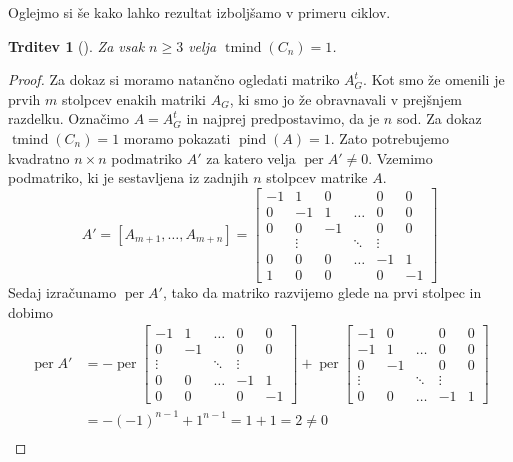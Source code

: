 \documentclass[12pt,a4paper,twoside]{article}
\theoremstyle{definition} %
\theoremstyle{plain} %
\newtheorem{trditev}[definicija]{Trditev}
\numberwithin{equation}{section}  %
\DeclareMathOperator{\per}{per}
\DeclareMathOperator{\tmind}{tmind}
\DeclareMathOperator{\pind}{pind}
\begin{document}
Oglejmo si še kako lahko rezultat izboljšamo v primeru ciklov.
\begin{trditev}[\citet{algebraic}]
\label{list_t_cycle}
Za vsak $n\ge 3$ velja $\tmind(C_n) = 1$.
\end{trditev}

\begin{proof}
Za dokaz si moramo natančno ogledati matriko $A_G^t$. Kot smo že omenili je prvih $m$ stolpcev enakih matriki $A_G$, ki smo jo že obravnavali v prejšnjem razdelku. Označimo $A =  A_G^t$ in najprej predpostavimo, da je $n$ sod. Za dokaz $\tmind(C_n) = 1$ moramo pokazati $\pind(A) = 1$. Zato potrebujemo kvadratno $n \times n$ podmatriko $A'$ za katero velja $\per A' \neq 0$. Vzemimo podmatriko, ki je sestavljena iz zadnjih $n$ stolpcev matrike $A$.
$$ 
A' =[A_{m+1}, \ldots, A_{m+n}] = 
\left[
\begin{matrix} -1 & 1 & 0 &  & 0 & 0 \\ 0 & -1 & 1 & \ldots & 0 & 0 \\
0 & 0 & -1 &  & 0 & 0 \\ 
 & \vdots &  & \ddots & \vdots &  \\ 
0 & 0 & 0 & \ldots & -1 & 1 \\
 1 & 0 & 0 &  & 0 & -1 
\end{matrix} \right]
$$
Sedaj izračunamo $\per A'$, tako da matriko razvijemo glede na prvi stolpec in dobimo
\begin{equation*}
\begin{split}
 \per A' &=-\per \left[ 
\begin{matrix} 
 -1 & 1 & \ldots & 0 & 0 \\ 
 0 & -1 &  & 0 & 0 \\ 
 \vdots &  & \ddots & \vdots &  \\ 
 0 & 0 & \ldots & -1 & 1 \\
 0 & 0 &  & 0 & -1 
\end{matrix} \right]
+\per\left[
\begin{matrix} 
- 1 & 0 &  & 0 & 0 \\
 -1 & 1 & \ldots & 0 & 0 \\  0 & -1 &  & 0 & 0 \\ 
  \vdots &  & \ddots & \vdots &  \\ 
 0 & 0 & \ldots & -1 & 1 
\end{matrix} \right] \\
&=-(-1)^{n-1} + 1^{n-1} =  1 + 1 = 2 \neq 0\\
\end{split}
\end{equation*}

\end{proof}
\end{document}
